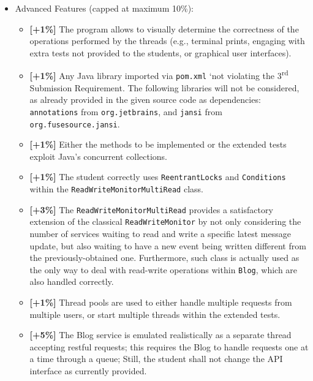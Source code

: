 \documentclass{article}
\begin{document}
\begin{itemize}
\item  Advanced Features (capped at maximum 10\%):
\begin{itemize}
	\item \textbf{[+1\%]} The program allows to visually determine the correctness of the operations performed by the threads (e.g., terminal prints, engaging with extra tests not provided to the students, or graphical user interfaces).
	\item \textbf{[+1\%]} Any Java library imported via \texttt{pom.xml} `not violating the 3\textsuperscript{rd} Submission Requirement. The following libraries will not be considered, as already provided in the given source code as dependencies: \texttt{annotations} from \texttt{org.jetbrains}, and \texttt{jansi} from \texttt{org.fusesource\-.jansi}.
	\item  \textbf{[+1\%]} Either the methods to be implemented or the extended tests exploit Java's concurrent collections.
\item \textbf{[+1\%]} The student correctly uses \texttt{ReentrantLocks} and \texttt{Conditions} within the \texttt{ReadWrite\-MonitorMultiRead} class.
\item \textbf{[+3\%]} The \texttt{ReadWriteMonitorMultiRead} provides a satisfactory extension of the classical \texttt{ReadWriteMonitor} by not only considering the number of services waiting to read and write a specific latest message update, but also waiting to have a new event being written different from the previously-obtained one. Furthermore, such class is actually used as the only way to deal with read-write operations within \texttt{Blog}, which are also handled correctly.
	\item \textbf{[+1\%]} Thread pools are used to either handle multiple requests from multiple users, or start multiple threads within the extended tests.
	\item  \textbf{[+5\%]} The Blog service is emulated realistically as a separate thread accepting restful requests; this requires the Blog to handle requests one at a time through a queue; Still, the student shall not change the API interface as currently provided.








\end{itemize}
	\end{itemize}


	
\end{document}
